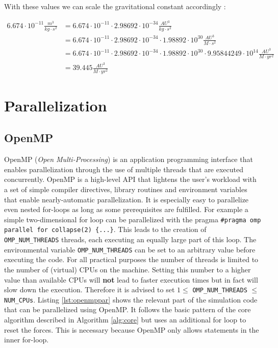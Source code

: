 \documentclass[a4paper,11pt]{scrartcl} %
\begin{document}
With these values we can scale the gravitational constant accordingly \cite{astrounits}:

\begin{align*}
	6.674 \cdot 10^{-11} \frac{m^3}{kg \cdot s^2}
	& =  6.674 \cdot 10^{-11} \cdot 2.98692\cdot 10^{-34} \frac{AU^3}{kg \cdot s^2}\\
	& = 6.674 \cdot 10^{-11} \cdot 2.98692\cdot 10^{-34} \cdot 1.98892 \cdot 10^{30} \frac{AU^3}{M \cdot s^2} \\
	& = 6.674 \cdot 10^{-11} \cdot 2.98692\cdot 10^{-34} \cdot 1.98892 \cdot 10^{30} \cdot 9.95844249\cdot 10^{14} \frac{AU^3}{M \cdot yr^2}\\
	& = 39.445 \frac{AU^3}{M \cdot yr^2}
\end{align*}

\section{Parallelization}
\subsection{OpenMP}
OpenMP (\textit{Open Multi-Processing}) is an application programming interface that enables parallelization through the use of multiple threads that are executed concurrently. OpenMP is a high-level API that lightens the user's workload with a set of simple compiler directives, library routines and environment variables that enable nearly-automatic parallelization. It is especially easy to parallelize even nested for-loops as long as some prerequisites are fulfilled. For example a simple two-dimensional for loop can be parallelized with the pragma \texttt{\#pragma omp parallel for collapse(2) \{...\}}. This leads to the creation of \texttt{OMP\_NUM\_THREADS} threads, each executing an equally large part of this loop. The environmental variable \texttt{OMP\_NUM\_THREADS} can be set to an arbitrary value before executing the code. For all practical purposes the number of threads is limited to the number of (virtual) CPUs on the machine. Setting this number to a higher value than available CPUs will \textbf{not} lead to faster execution times but in fact will slow down the execution. Therefore it is advised to set $1 \leq $ \texttt{OMP\_NUM\_THREADS} $\leq $ \texttt{NUM\_CPUs}. Listing \ref{lst:openmppar} shows the relevant part of the simulation code that can be parallelized using OpenMP. It follows the basic pattern of the core algorithm described in Algorithm \ref{alg:core} but uses an additional for loop to reset the forces. This is necessary because OpenMP only allows statements in the inner for-loop.\\
\end{document}
